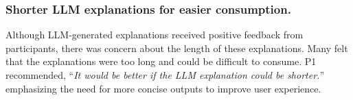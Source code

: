 \subsubsection{Shorter LLM explanations for easier consumption.}

Although LLM-generated explanations received positive feedback from participants, there was concern about the length of these explanations. Many felt that the explanations were too long and could be difficult to consume. P1 recommended, ``\textit{It would be better if the LLM explanation could be shorter.}'' emphasizing the need for more concise outputs to improve user experience.















